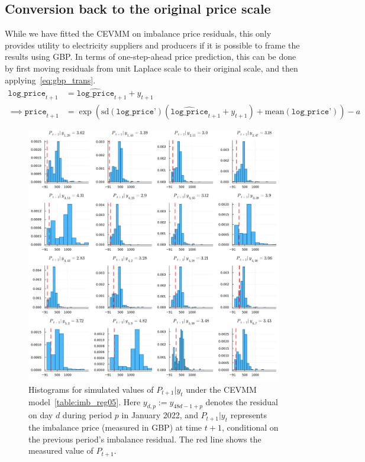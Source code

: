 \documentclass[11pt,twoside,openany]{book}
\newcommand{\code}[1]{\texttt{#1}}
\numberwithin{Theorem}{chapter}
\numberwithin{Definition}{chapter}
\numberwithin{Lemma}{chapter}
\numberwithin{Algorithm}{chapter}
\numberwithin{equation}{chapter}
\begin{document}
\FloatBarrier
\subsection{Conversion back to the original price scale}

While we have fitted the CEVMM on imbalance price residuals, this only provides
utility to electricity suppliers and producers if it is possible to frame the
results using GBP. In terms of one-step-ahead price prediction,
this can be done by first moving residuals from unit Laplace scale to their
original scale, and then applying~\eqref{eq:gbp_trans}.
  \begin{equation}\label{eq:gbp_trans}
  \begin{split}
    \code{log_price}_{t+1} &= \widehat{\code{log_price}}_{t+1} + y_{t+1}\\
    \implies \code{price}_{t+1} &=
    \exp\left(\text{sd}(\code{log_price'})
    (\widehat{\code{log_price}}_{t+1} + y_{t+1}) + \text{mean}(\code{log_price'})\right) - a
   \end{split}
\end{equation}

\begin{figure}[htp]
  \centering
  \includegraphics[scale=0.5]{../elexon/figures/price_preds_jan_22.pdf}
  \caption{Histograms for simulated values of $P_{t+1}|y_{t}$ under the CEVMM
    model~\ref{table:imb_reg05}. Here $y_{d,p}:=y_{48d - 1 + p}$ denotes the
    residual on day $d$ during period $p$ in January 2022, and $P_{t+1}|y_t$
    represents the imbalance price (measured in GBP) at time $t+1$, conditional
  on the previous period's imbalance residual. The red line shows the measured
value of $P_{t+1}$.}\label{fig:gbp_trans_hists}
\end{figure}
\end{document}
